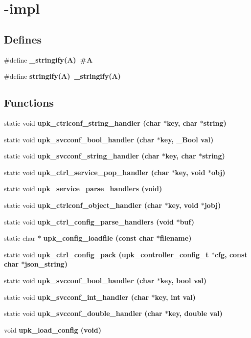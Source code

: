 \section{-impl}
\label{group__config}
\subsection*{Defines}
\begin{CompactItemize}
\item 
\#define \bf{\_\-stringify}(A)~\#A
\item 
\#define \bf{stringify}(A)~\_\-stringify(A)
\end{CompactItemize}
\subsection*{Functions}
\begin{CompactItemize}
\item 
static void \bf{upk\_\-ctrlconf\_\-string\_\-handler} (char $\ast$key, char $\ast$string)
\item 
static void \bf{upk\_\-svcconf\_\-bool\_\-handler} (char $\ast$key, \_\-Bool val)
\item 
static void \bf{upk\_\-svcconf\_\-string\_\-handler} (char $\ast$key, char $\ast$string)
\item 
static void \bf{upk\_\-ctrl\_\-service\_\-pop\_\-handler} (char $\ast$key, void $\ast$obj)
\item 
static void \bf{upk\_\-service\_\-parse\_\-handlers} (void)
\item 
static void \bf{upk\_\-ctrlconf\_\-object\_\-handler} (char $\ast$key, void $\ast$jobj)
\item 
static void \bf{upk\_\-ctrl\_\-config\_\-parse\_\-handlers} (void $\ast$buf)
\item 
static char $\ast$ \bf{upk\_\-config\_\-loadfile} (const char $\ast$filename)
\item 
static void \bf{upk\_\-ctrl\_\-config\_\-pack} (\bf{upk\_\-controller\_\-config\_\-t} $\ast$cfg, const char $\ast$json\_\-string)
\item 
static void \bf{upk\_\-svcconf\_\-bool\_\-handler} (char $\ast$key, bool val)
\item 
static void \bf{upk\_\-svcconf\_\-int\_\-handler} (char $\ast$key, int val)
\item 
static void \bf{upk\_\-svcconf\_\-double\_\-handler} (char $\ast$key, double val)
\item 
void \bf{upk\_\-load\_\-config} (void)
\end{CompactItemize}
